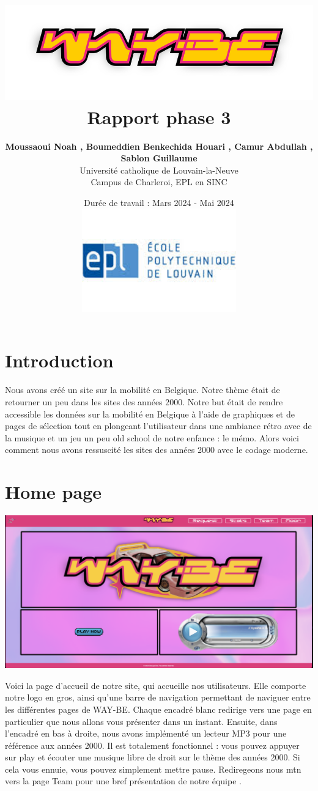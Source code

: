 \documentclass{article}
\title{
    \includegraphics[width=1\textwidth]{logo/titre.png} \\
    \vspace{1.5cm}
    {\Huge \textbf{Rapport phase 3}} \\
    \vspace{1.5cm}
}
\author{
    \textbf{Moussaoui Noah , Boumeddien Benkechida Houari , Camur Abdullah , Sablon Guillaume} \\
    Université catholique de Louvain-la-Neuve \\
    Campus de Charleroi, EPL en SINC 
}
\date{
    \vspace{1.5cm}
    Durée de travail : Mars 2024 - Mai 2024 \\
     \vspace{1.5cm}
    \includegraphics[width=0.5\textwidth]{logo/EPL.jpeg}
}
\begin{document}
\begin{titlingpage}
\maketitle
\end{titlingpage}

\newpage
\tableofcontents
\newpage

\section{ Introduction }

Nous avons créé un site sur la mobilité en Belgique. Notre thème était de retourner un peu dans les sites des années 2000. Notre but était de rendre accessible les données sur la mobilité en Belgique à l'aide de graphiques et de pages de sélection tout en plongeant l'utilisateur dans une ambiance rétro avec de la musique et un jeu un peu old school de notre enfance : le mémo. Alors voici comment nous avons ressuscité les sites des années 2000 avec le codage moderne.

\section{Home page}

\begin{center}
    \includegraphics[scale=0.5]{logo/h.png}
\end{center}

Voici la page d'accueil de notre site, qui accueille nos utilisateurs. Elle comporte notre logo en gros, ainsi qu'une barre de navigation permettant de naviguer entre les différentes pages de WAY-BE. Chaque encadré blanc redirige vers une page en particulier que nous allons vous présenter dans un instant. Ensuite, dans l'encadré en bas à droite, nous avons implémenté un lecteur MP3 pour une référence aux années 2000. Il est totalement fonctionnel : vous pouvez appuyer sur play et écouter une musique libre de droit sur le thème des années 2000. Si cela vous ennuie, vous pouvez simplement mettre pause.
Rediregeons nous mtn vers la page Team pour une bref présentation de notre équipe . 
\end{document}

